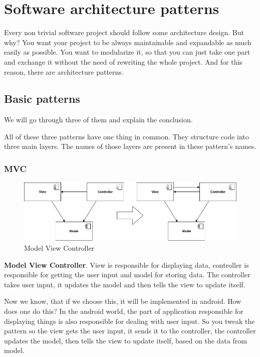 
\section{Software architecture patterns}
Every non trivial software project should follow some architecture design.
But why? You want your project to be always maintainable and expandable as much easily as possible.
You want to modularize it, so that you can just take one part and exchange it without the need of rewriting the whole project.
And for this reason, there are architecture patterns.

\subsection{Basic patterns}
We will go through three of them and explain the conclusion.

All of these three patterns have one thing in common.
They structure code into three main layers.
The names of those layers are present in these pattern's names.

\subsubsection{MVC}

\begin{figure}\centering
	\includegraphics[width=1\textwidth]{pics/patterns/bc-mvc2.png}
	\caption[MVC]{Model View Controller}\label{fig:mvc}
\end{figure}

\textbf{Model View Controller}.
View is responsible for displaying data, controller is responsible for getting the user input and model for storing data.
The controller takes user input, it updates the model and then tells the view to update itself.\cite{droidcon}

Now we know, that if we choose this, it will be implemented in android.
How does one do this? In the android world, the part of application responsible for displaying things is also responsible for dealing with user input.
So you tweak the pattern so the view gets the user input, it sends it to the controller, the controller updates the model, then tells the view to update itself, based on the data from model.\cite{droidcon}

